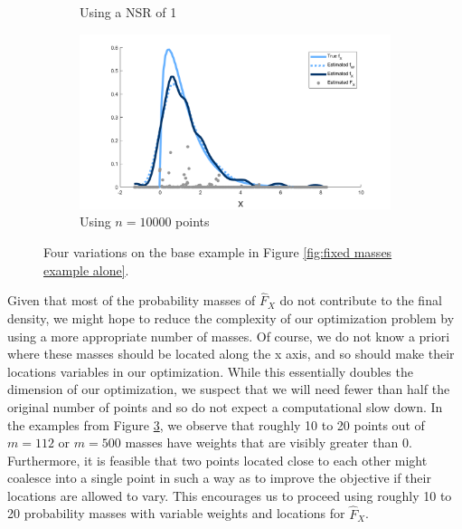 \begin{figure}
\begin{subfigure}[b]{0.49\textwidth}
		\caption{Using a NSR of 1}
		\label{fig:fixed masses example NSR1}
	\end{subfigure}
	\hfill
	\begin{subfigure}[b]{0.49\textwidth}
		\centering
		\includegraphics[width = \textwidth]{Figures/Deconvolution/fixed_masses_example_n10000_updated.png}
		\caption{Using $n = 10000$ points}
		\label{fig:fixed masses example n10000}
	\end{subfigure}
	\caption{Four variations on the base example in Figure \ref{fig:fixed masses example alone}.}
	\label{fig:comparison different fixed masses examples}
\end{figure}

Given that most of the probability masses of $\hat{F}_X$ do not contribute to the final density, we might hope to reduce the complexity of our optimization problem by using a more appropriate number of masses. Of course, we do not know a priori where these masses should be located along the x axis, and so should make their locations variables in our optimization. While this essentially doubles the dimension of our optimization, we suspect that we will need fewer than half the original number of points and so do not expect a computational slow down. In the examples from Figure \ref{fig:comparison different fixed masses examples}, we observe that roughly 10 to 20 points out of $m = 112$ or $m = 500$ masses have weights that are visibly greater than 0. Furthermore, it is feasible that two points located close to each other might coalesce into a single point in such a way as to improve the objective if their locations are allowed to vary. This encourages us to proceed using roughly 10 to 20 probability masses with variable weights and locations for $\hat{F}_X$.

